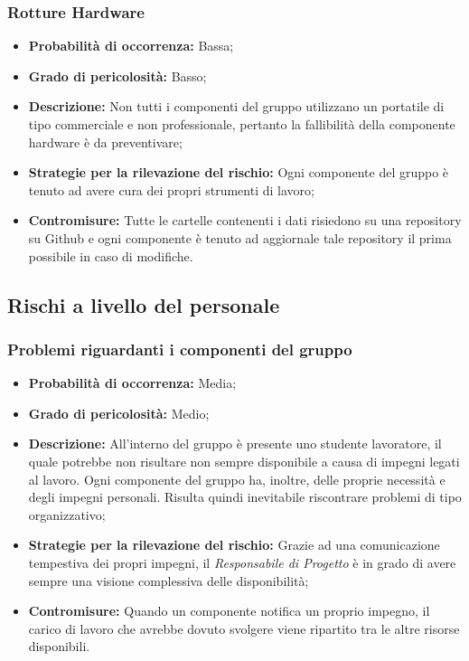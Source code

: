 		\subsubsection{Rotture Hardware}
		\begin{itemize}
			\item \textbf{Probabilità di occorrenza:} Bassa; \\
			\item \textbf{Grado di pericolosità:} Basso; \\
			\item \textbf{Descrizione:} Non tutti i componenti del gruppo utilizzano un portatile di tipo commerciale e non professionale, pertanto la fallibilità della componente hardware è da preventivare; \\
			\item \textbf{Strategie per la rilevazione del rischio:} Ogni componente del gruppo è tenuto ad avere cura dei propri strumenti di lavoro; \\
			\item \textbf{Contromisure:} Tutte le cartelle contenenti i dati risiedono su una repository su Github e ogni componente è tenuto ad aggiornale tale repository il prima possibile in caso di modifiche. \\
		\end{itemize}
	\subsection{Rischi a livello del personale}
		\subsubsection{Problemi riguardanti i componenti del gruppo}
		\begin{itemize}
			\item \textbf{Probabilità di occorrenza:} Media; \\
			\item \textbf{Grado di pericolosità:} Medio; \\
			\item \textbf{Descrizione:} All'interno del gruppo è presente uno studente lavoratore, il quale potrebbe non risultare non sempre disponibile a causa di impegni legati al lavoro. Ogni componente del gruppo ha, inoltre, delle proprie necessità e degli impegni personali. Risulta quindi inevitabile riscontrare problemi di tipo organizzativo; \\
			\item \textbf{Strategie per la rilevazione del rischio:} Grazie ad una comunicazione tempestiva dei propri impegni, il \textit{Responsabile di Progetto} è in grado di avere sempre una visione complessiva delle disponibilità; \\
			\item \textbf{Contromisure:} Quando un componente notifica un proprio impegno, il carico di lavoro che avrebbe dovuto svolgere viene ripartito tra le altre risorse disponibili. \\
		\end{itemize}

